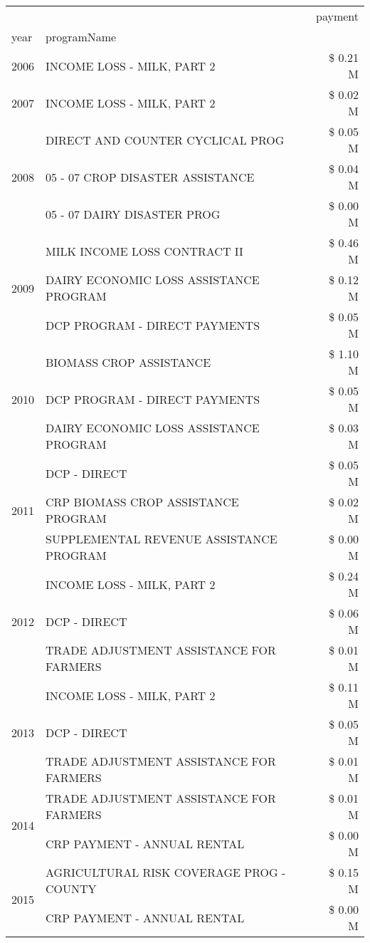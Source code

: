 \begin{tabular}{llr}
\toprule
 &  & payment \\
year & programName &  \\
\midrule
2006 & INCOME LOSS - MILK, PART 2 & \$ 0.21 M \\
\cline{1-3}
2007 & INCOME LOSS - MILK, PART 2 & \$ 0.02 M \\
\cline{1-3}
\multirow[t]{3}{*}{2008} & DIRECT AND COUNTER CYCLICAL PROG & \$ 0.05 M \\
 & 05 - 07 CROP DISASTER ASSISTANCE & \$ 0.04 M \\
 & 05 - 07 DAIRY DISASTER PROG & \$ 0.00 M \\
\cline{1-3}
\multirow[t]{3}{*}{2009} & MILK INCOME LOSS CONTRACT II & \$ 0.46 M \\
 & DAIRY ECONOMIC LOSS ASSISTANCE PROGRAM & \$ 0.12 M \\
 & DCP PROGRAM - DIRECT PAYMENTS & \$ 0.05 M \\
\cline{1-3}
\multirow[t]{3}{*}{2010} & BIOMASS CROP ASSISTANCE & \$ 1.10 M \\
 & DCP PROGRAM - DIRECT PAYMENTS & \$ 0.05 M \\
 & DAIRY ECONOMIC LOSS ASSISTANCE PROGRAM & \$ 0.03 M \\
\cline{1-3}
\multirow[t]{3}{*}{2011} & DCP - DIRECT & \$ 0.05 M \\
 & CRP BIOMASS CROP ASSISTANCE PROGRAM & \$ 0.02 M \\
 & SUPPLEMENTAL REVENUE ASSISTANCE PROGRAM & \$ 0.00 M \\
\cline{1-3}
\multirow[t]{3}{*}{2012} & INCOME LOSS - MILK, PART 2 & \$ 0.24 M \\
 & DCP - DIRECT & \$ 0.06 M \\
 & TRADE ADJUSTMENT ASSISTANCE FOR FARMERS & \$ 0.01 M \\
\cline{1-3}
\multirow[t]{3}{*}{2013} & INCOME LOSS - MILK, PART 2 & \$ 0.11 M \\
 & DCP - DIRECT & \$ 0.05 M \\
 & TRADE ADJUSTMENT ASSISTANCE FOR FARMERS & \$ 0.01 M \\
\cline{1-3}
\multirow[t]{2}{*}{2014} & TRADE ADJUSTMENT ASSISTANCE FOR FARMERS & \$ 0.01 M \\
 & CRP PAYMENT - ANNUAL RENTAL & \$ 0.00 M \\
\cline{1-3}
\multirow[t]{2}{*}{2015} & AGRICULTURAL RISK COVERAGE PROG - COUNTY & \$ 0.15 M \\
 & CRP PAYMENT - ANNUAL RENTAL & \$ 0.00 M \\

\end{tabular}
